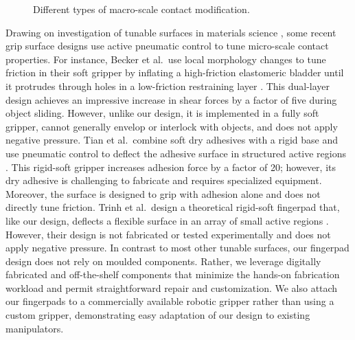 \begin{figure}[bt]
    \centering
    
    \vspace{0.1mm}
    \caption{Different types of macro-scale contact modification.}
    \label{fig:macro}
    \vspace{-3mm}
\end{figure}

Drawing on investigation of tunable surfaces in materials science \cite{CalaisAlvaradoAdvancedFunctionalMaterials2019}, some recent grip surface designs use active pneumatic control to tune micro-scale contact properties.
%
For instance, Becker et al.\ use local morphology changes to tune friction in their soft gripper by inflating a high-friction elastomeric bladder until it protrudes through holes in a low-friction restraining layer \cite{BeckerEtAlTunableFrictionConstrained2017}.
%
This dual-layer design achieves an impressive increase in shear forces by a factor of five during object sliding. 
%
However, unlike our design, it is implemented in a fully soft gripper, cannot generally envelop or interlock with objects, and does not apply negative pressure. 
%
Tian et al.\ combine soft dry adhesives with a rigid base and use pneumatic control to deflect the adhesive surface in structured active regions \cite{TianEtAlGeckoEffectInspiredSoft2019}. 
% 
This rigid-soft gripper increases adhesion force by a factor of 20; however, its dry adhesive is challenging to fabricate and requires specialized equipment. 
%
Moreover, the surface is designed to grip with adhesion alone and does not directly tune friction.
%
Trinh et al.\ design a theoretical rigid-soft fingerpad that, like our design, deflects a flexible surface in an array of small active regions \cite{TrinhEtAlTheoreticalFoundationDesign2019}. 
% 
However, their design is not fabricated or tested experimentally and does not apply negative pressure. 
%
In contrast to most other tunable surfaces, our fingerpad design does not rely on moulded components. 
%
Rather, we leverage digitally fabricated and off-the-shelf components that minimize the hands-on fabrication workload and permit straightforward repair and customization. 
%
We also attach our fingerpads to a commercially available robotic gripper rather than using a custom gripper, demonstrating easy adaptation of our design to existing manipulators.